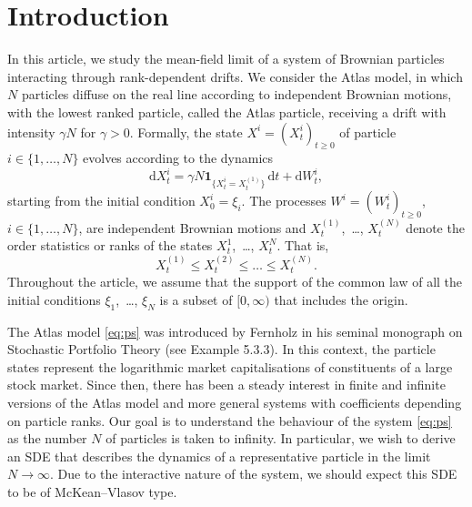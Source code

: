 \documentclass[11pt, a4paper]{article}
\theoremstyle{plain}
\theoremstyle{definition}
\theoremstyle{remark}
\numberwithin{equation}{section}
\renewcommand{\d}{\mathrm{d}}
\renewcommand{\bf}[1]{\mathbf{#1}}
\begin{document}
\section{Introduction}

In this article, we study the mean-field limit of a system of Brownian particles interacting through rank-dependent drifts. We consider the Atlas model, in which $N$ particles diffuse on the real line according to independent Brownian motions, with the lowest ranked particle, called the Atlas particle, receiving a drift with intensity $\gamma N$ for $\gamma > 0$. Formally, the state $X^i = (X^i_t)_{t \geq 0}$ of particle $i \in \{1, \dots, N\}$ evolves according to the dynamics
\begin{equation} \label{eq:ps}
    \d X^i_t = \gamma N \bf{1}_{\{X^i_t = X^{(1)}_t\}} \, \d t + \d W^i_t,
\end{equation}
starting from the initial condition $X^i_0 = \xi_i$. The processes $W^i = (W^i_t)_{t \geq 0}$, $i \in \{1, \dots, N\}$, are independent Brownian motions and $X^{(1)}_t$,~\ldots, $X^{(N)}_t$ denote the order statistics or ranks of the states $X^1_t$,~\ldots, $X^N_t$. That is,
\begin{equation*}
    X^{(1)}_t \leq X^{(2)}_t \leq \dots \leq X^{(N)}_t.
\end{equation*}
Throughout the article, we assume that the support of the common law of all the initial conditions $\xi_1$,~\ldots, $\xi_N$ is a subset of $[0, \infty)$ that includes the origin. 

The Atlas model \eqref{eq:ps} was introduced by Fernholz in his seminal monograph \cite{fernholz_spt_2002} on Stochastic Portfolio Theory (see Example 5.3.3). In this context, the particle states represent the logarithmic market capitalisations of constituents of a large stock market. Since then, there has been a steady interest in finite and infinite versions of the Atlas model \cite{banner_atlas_2005, pal_ranked_bm_2008, chatterjee_rank_2010, pal_ranked_concentration_2014,  dembo_atlas_2017, cabezas_rank_2019, atar_atlas_2025} and more general systems with coefficients depending on particle ranks. Our goal is to understand the behaviour of the system \eqref{eq:ps} as the number $N$ of particles is taken to infinity. In particular, we wish to derive an SDE that describes the dynamics of a representative particle in the limit $N \to \infty$. Due to the interactive nature of the system, we should expect this SDE to be of McKean--Vlasov type.
\end{document}
